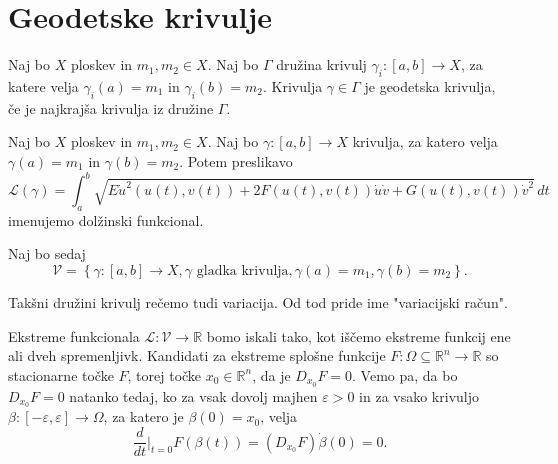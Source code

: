 \section{Geodetske krivulje}

\begin{definicija}
\label{def_geodetska_krivulja}
Naj bo $X$ ploskev in $m_1, m_2 \in X$. Naj bo $\Gamma$ družina krivulj $\gamma_i: [a,b] \to X$, za katere velja $\gamma_i(a) = m_1$ in $\gamma_i(b) = m_2$.
Krivulja $\gamma \in  \Gamma$ je geodetska krivulja, če je najkrajša krivulja iz družine $\Gamma$. 
\end{definicija}

\begin{definicija}
\label{def_dolzinski_funkcional}
Naj bo $X$ ploskev in $m_1, m_2 \in X$. Naj bo $\gamma: [a,b] \to  X$ krivulja, za katero velja $\gamma(a) = m_1$ in $\gamma(b) = m_2$. Potem preslikavo \begin{equation*}
\mathcal{L}(\gamma) = \int_{a}^{b} \sqrt{E \dot{u}^2(u(t), v(t)) + 2F(u(t), v(t)) \dot{u} \dot{v} + G(u(t), v(t)) \dot{v}^2}  \, dt 
\end{equation*}  
imenujemo dolžinski funkcional.
\end{definicija}

Naj bo sedaj \begin{equation*}
\mathcal{V} = \left\{ \gamma: [a,b] \to  X, \gamma \text{ gladka krivulja}, \gamma(a) = m_1, \gamma(b) = m_2 \right\}. 
\end{equation*}
\begin{opomba}
Takšni družini krivulj rečemo tudi variacija. Od tod pride ime "variacijski račun".
\end{opomba}
Ekstreme funkcionala $\mathcal{L}: \mathcal{V} \to  \mathbb{R}$ bomo iskali tako, kot iščemo ekstreme
funkcij ene ali dveh spremenljivk. Kandidati za ekstreme splošne funkcije $F: \Omega \subseteq \mathbb{R}^n \to  \mathbb{R}$ so stacionarne točke $F$, torej
točke $x_0 \in \mathbb{R}^n$, da je $D_{x_0}F = 0$. Vemo pa, da bo $D_{x_0}F = 0$ natanko tedaj, ko za vsak dovolj majhen $\varepsilon > 0$ in za vsako krivuljo
$\beta: [- \varepsilon, \varepsilon] \to  \Omega$, za katero je $\beta(0) = x_0$, velja \begin{equation*}
\frac{d}{dt}  \bigg|_{t = 0} F(\beta(t)) = (D_{x_0}F) \dot{\beta}(0) = 0. 
\end{equation*}  

